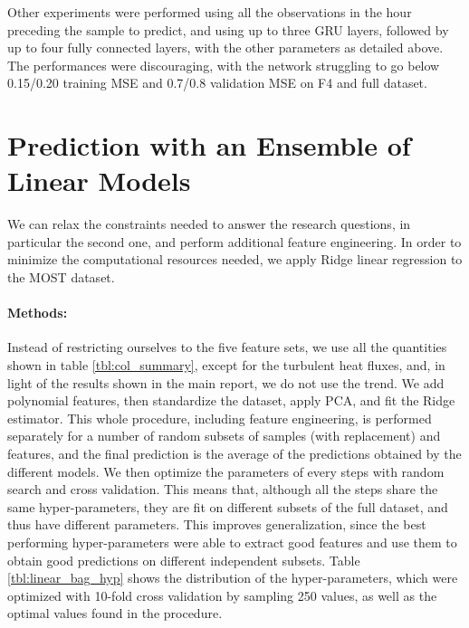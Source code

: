 \documentclass[a4paper,11pt]{kth-mag}
\begin{document}
Other experiments were performed using all the observations in the hour preceding the sample to predict, and using up to three GRU layers, followed by up to four fully connected layers, with the other parameters as detailed above. The performances were discouraging, with the network struggling to go below 0.15/0.20 training MSE and 0.7/0.8 validation MSE on F4 and full dataset.

\section{Prediction with an Ensemble of Linear Models}
\label{apx:linear_ensemble}
We can relax the constraints needed to answer the research questions, in particular the second one, and perform additional feature engineering. In order to minimize the computational resources needed, we apply Ridge linear regression to the MOST dataset.

\paragraph{Methods:}
Instead of restricting ourselves to the five feature sets, we use all the quantities shown in table \ref{tbl:col_summary}, except for the turbulent heat fluxes, and, in light of the results shown in the main report, we do not use the trend. We add polynomial features, then standardize the dataset, apply PCA, and fit the Ridge estimator. This whole procedure, including feature engineering, is performed separately for a number of random subsets of samples (with replacement) and features, and the final prediction is the average of the predictions obtained by the different models. We then optimize the parameters of every steps with random search and cross validation. This means that, although all the steps share the same hyper-parameters, they are fit on different subsets of the full dataset, and thus have different parameters. This improves generalization, since the best performing hyper-parameters were able to extract good features and use them to obtain good predictions on different independent subsets. Table \ref{tbl:linear_bag_hyp} shows the distribution of the hyper-parameters, which were optimized with 10-fold cross validation by sampling 250 values, as well as the optimal values found in the procedure.
\end{document}
